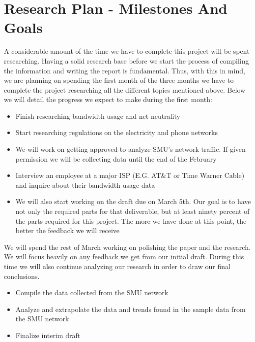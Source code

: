 \documentclass{sigcomm-alternate}
\begin{document}
\section{Research Plan - Milestones And Goals}


A considerable amount of the time we have to complete this project will be spent researching. Having a solid research base before we start the process of compiling the information and writing the report is fundamental. Thus, with this in mind, we are planning on spending the first month of the three months we have to complete the project researching all the different topics mentioned above. Below we will detail the progress we expect to make during the first month:

\begin{itemize}	
	\item Finish researching bandwidth usage and net neutrality

	\item Start researching regulations on the electricity and phone networks

	\item We will work on getting approved to analyze SMU's network traffic. If given permission we will be collecting data until the end of the February
		
	\item Interview an employee at a major ISP (E.G. AT\&T or Time Warner Cable) and inquire about their bandwidth usage data
		
	\item We will also start working on the draft due on March 5th. Our goal is to have not only the required parts for that deliverable, but at least ninety percent of the parts required for this project. The more we have done at this point, the better the feedback we will receive%
		
\end{itemize}



We will spend the rest of March working on polishing the paper and the research. We will focus heavily on any feedback we get from our initial draft. During this time we will also continue analyzing our research in order to draw our final conclusions.
\begin{itemize}
	\item Compile the data collected from the SMU network
	\item Analyze and extrapolate the data and trends found in the sample data from the SMU network
	\item Finalize interim draft
\end{itemize}
\end{document}
